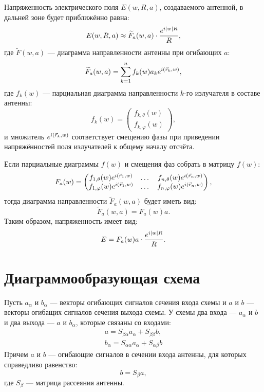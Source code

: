 Напряженность электрического поля $E(w,R,a)$, создаваемого антенной, в дальней зоне будет приближённо равна:
\[
    E(w,R,a) \approx \widetilde{F}_a(w,a) \cdot \frac{e^{i \left | w \right | R}}{R} ,
\]
где $\widetilde{F}(w,a)$ --- диаграмма направленности антенны при огибающих $a$:
\[
    \widetilde{F}_a(w,a) = \sum_{k=1}^n f_k(w) a_k e^{i \left ( \vec{r}_k, w \right )} ,
\]
где $f_k(w)$ --- парциальная диаграмма направленности $k$-го излучателя в составе антенны:
\[
    f_k(w) =
    \begin{pmatrix}
        f_{k,\theta}(w) \\
        f_{k,\varphi}(w)
    \end{pmatrix}
    ,
\]
и множитель $e^{i \left ( \vec{r}_k, w \right )}$ соответствует смещению фазы при приведении напряжённостей поля излучателей к общему началу отсчёта.

Если парциальные диаграммы $f(w)$ и смещения фаз собрать в матрицу $f(w)$:
\begin{gather*}
    F_a(w) =
    \begin{pmatrix}
        f_{1,\theta}(w) e^{i \left ( \vec{r}_1, w \right )}  & \dots & f_{n,\theta}(w) e^{i \left ( \vec{r}_n, w \right )}  \\
        f_{1,\varphi}(w) e^{i \left ( \vec{r}_1, w \right )} & \dots & f_{n,\varphi}(w) e^{i \left ( \vec{r}_n, w \right )}
    \end{pmatrix} ,
\end{gather*}
тогда диаграмма направленности $\widetilde{F}_a(w,a)$ будет иметь вид:
\[
    \widetilde{F}_a(w,a) = F_a(w) a.
\]
Таким образом, напряженность имеет вид:
\[
    E = F_a(w) a \cdot \frac{e^{i \left | w \right | R}}{R} .
\]


\section{Диаграммообразующая схема}

Пусть $a_\alpha$ и $b_\alpha$ --- векторы огибающих сигналов сечения входа схемы и $a$ и $b$ --- векторы огибащих сигналов сечения выхода схемы. У схемы два входа ---
$a_\alpha$ и $b$ и два выхода --- $a$ и $b_\alpha$, которые связаны со входами:
\begin{gather}
    a        = S_{\beta \alpha} a_\alpha + S_{\beta \beta} b
    \label{emission:scheme:upper_output}, \\
    b_\alpha = S_{\alpha \alpha} a_\alpha + S_{\alpha \beta} b
    \label{emission:scheme:lower_output}
\end{gather}
Причем $a$ и $b$ --- огибающие сигналов в сечении входа антенны, для которых справедливо равенство:
\begin{equation}
    \label{emission:scheme:reflections}
    b = S_\beta a ,
\end{equation}
где $S_\beta$ --- матрица рассеяния антенны.

